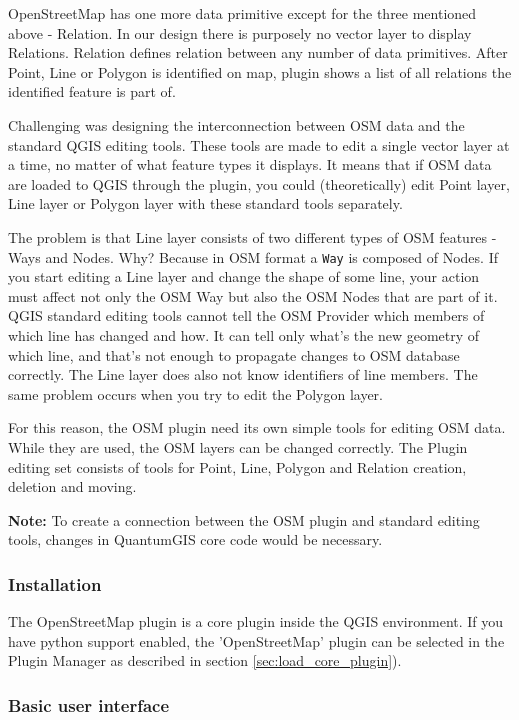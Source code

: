 OpenStreetMap has one more data primitive except for the three mentioned
above - Relation. In our design there is purposely no vector layer to display
Relations. Relation defines relation between any number of data primitives.
After Point, Line or Polygon is identified on map, plugin shows a list of all
relations the identified feature is part of.

Challenging was designing the interconnection between OSM data and the 
standard QGIS editing tools. These tools are made to edit a single vector 
layer at a time, no matter of what feature types it displays. It means 
that if OSM data are loaded to QGIS through the plugin, you could 
(theoretically) edit Point layer, Line layer or Polygon layer with these 
standard tools separately.

The problem is that Line layer consists of two different types of OSM
features - Ways and Nodes. Why? Because in OSM format a \texttt{Way} is 
composed of Nodes. If you start editing a Line layer and change the 
shape of some line, your action must affect not only the OSM Way but 
also the OSM Nodes that are part of it. \\
QGIS standard editing tools cannot tell the OSM Provider which members
of which line has changed and how. It can tell only what's the new geometry
of which line, and that's not enough to propagate changes to OSM database
correctly. The Line layer does also not know identifiers of line members.
The same problem occurs when you try to edit the Polygon layer.

For this reason, the OSM plugin need its own simple tools for editing 
OSM data. While they are used, the OSM layers can be changed correctly. 
The Plugin editing set consists of tools for Point, Line, Polygon and 
Relation creation, deletion and moving.

\textbf{Note:} To create a connection between the OSM plugin and standard 
editing tools, changes in QuantumGIS core code would be necessary.

\subsubsection{Installation}

The OpenStreetMap plugin is a core plugin inside the QGIS environment. If 
you have python support enabled, the 'OpenStreetMap' plugin can be selected 
in the Plugin Manager as described in section \ref{sec:load_core_plugin}). 

\subsubsection{Basic user interface}

